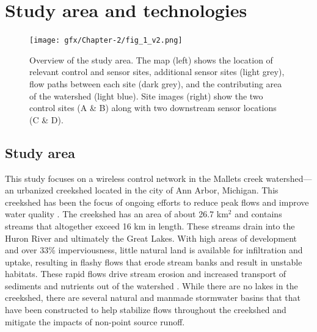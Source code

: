 \section{Study area and technologies}

\begin{figure}[H]
\centering
\texttt{[image: gfx/Chapter-2/fig\_1\_v2.png]}
\caption{Overview of the study area. The map (left) shows the location of relevant control and sensor sites, additional sensor sites (light grey), flow paths between each site (dark grey), and the contributing area of the watershed (light blue). Site images (right) show the two control sites (A \& B) along with two downstream sensor locations (C \& D).
}
\label{fig:fig1}
\end{figure}

\subsection{Study area}

This study focuses on a wireless control network in the Mallets creek watershed---an urbanized creekshed located in the city of Ann Arbor, Michigan. This creekshed has been the focus of ongoing efforts to reduce peak flows and improve water quality \cite{HRWC_2011}.
The creekshed has an area of about 26.7 km$^2$ and contains streams that altogether exceed 16 km in length. These streams drain into the Huron River and ultimately the Great Lakes. With high areas of development and over 33\% imperviousness, little natural land is available for infiltration and uptake, resulting in flashy flows that erode stream banks and result in unstable habitats.
These rapid flows drive stream erosion and increased transport of sediments and nutrients out of the watershed \cite{HRWC_2011}. 
While there are no lakes in the creekshed, there are several natural and manmade stormwater basins that that have been constructed to help stabilize flows throughout the creekshed and mitigate the impacts of non-point source runoff.

